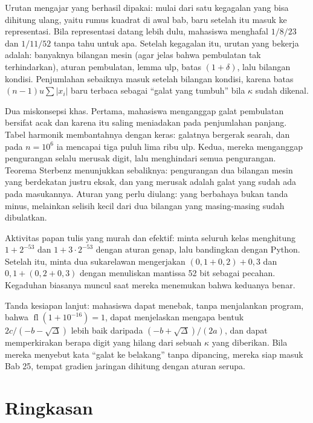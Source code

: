 \begin{untukdosen}
Urutan mengajar yang berhasil dipakai: mulai dari satu kegagalan yang bisa dihitung
ulang, yaitu rumus kuadrat di awal bab, baru setelah itu masuk ke representasi. Bila
representasi datang lebih dulu, mahasiswa menghafal $1/8/23$ dan $1/11/52$ tanpa tahu
untuk apa. Setelah kegagalan itu, urutan yang bekerja adalah: banyaknya bilangan mesin
(agar jelas bahwa pembulatan tak terhindarkan), aturan pembulatan, lemma ulp, batas
$(1+\delta)$, lalu bilangan kondisi. Penjumlahan sebaiknya masuk setelah bilangan
kondisi, karena batas $(n-1)u\sum|x_{i}|$ baru terbaca sebagai ``galat yang tumbuh''
bila $\kappa$ sudah dikenal.

Dua miskonsepsi khas. Pertama, mahasiswa menganggap galat pembulatan bersifat acak dan
karena itu saling meniadakan pada penjumlahan panjang. Tabel harmonik membantahnya
dengan keras: galatnya bergerak searah, dan pada $n=10^{6}$ ia mencapai tiga puluh
lima ribu ulp. Kedua, mereka menganggap pengurangan selalu merusak digit, lalu
menghindari semua pengurangan. Teorema Sterbenz menunjukkan sebaliknya: pengurangan
dua bilangan mesin yang berdekatan justru eksak, dan yang merusak adalah galat yang
sudah ada pada masukannya. Aturan yang perlu diulang: yang berbahaya bukan tanda
minus, melainkan selisih kecil dari dua bilangan yang masing-masing sudah dibulatkan.

Aktivitas papan tulis yang murah dan efektif: minta seluruh kelas menghitung
$1+2^{-53}$ dan $1+3\cdot2^{-53}$ dengan aturan genap, lalu bandingkan dengan Python.
Setelah itu, minta dua sukarelawan mengerjakan
$(0{,}1+0{,}2)+0{,}3$ dan $0{,}1+(0{,}2+0{,}3)$ dengan menuliskan mantissa 52 bit
sebagai pecahan. Kegaduhan biasanya muncul saat mereka menemukan bahwa keduanya benar.

Tanda kesiapan lanjut: mahasiswa dapat menebak, tanpa menjalankan program, bahwa
$\operatorname{fl}(1+10^{-16})=1$, dapat menjelaskan mengapa bentuk
$2c/(-b-\sqrt{\Delta})$ lebih baik daripada $(-b+\sqrt{\Delta})/(2a)$, dan dapat
memperkirakan berapa digit yang hilang dari sebuah $\kappa$ yang diberikan. Bila
mereka menyebut kata ``galat ke belakang'' tanpa dipancing, mereka siap masuk Bab 25,
tempat gradien jaringan dihitung dengan aturan serupa.
\end{untukdosen}

\section{Ringkasan}

